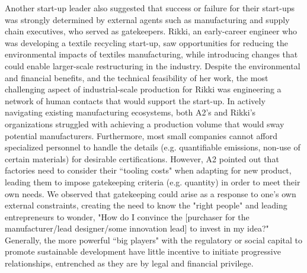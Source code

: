 \documentclass[manuscript,review,anonymous]{acmart}
\begin{document}
Another start-up leader also suggested that success or failure for their start-ups was strongly determined by external agents such as manufacturing and supply chain executives, who served as gatekeepers. Rikki, an early-career engineer who was developing a textile recycling start-up, saw opportunities for reducing the environmental impacts of textiles manufacturing, while introducing changes that could enable larger-scale restructuring in the industry. Despite the environmental and financial benefits, and the technical feasibility of her work, the most challenging aspect of industrial-scale production for Rikki was engineering a network of human contacts that would support the start-up. In actively navigating existing manufacturing ecosystems, both A2's and Rikki's organizations struggled with achieving a production volume that would sway potential manufacturers. Furthermore, most small companies cannot afford specialized personnel to handle the details (e.g. quantifiable emissions, non-use of certain materials) for desirable certifications. However, A2 pointed out that factories need to consider their ``tooling costs" when adapting for new product, leading them to impose gatekeeping criteria (e.g. quantity) in order to meet their own needs. We observed that gatekeeping could arise as a response to one's own external constraints, creating the need to know the "right people" and leading entrepreneurs to wonder, "How do I convince the [purchaser for the manufacturer/lead designer/some innovation lead] to invest in my idea?" Generally, the more powerful ``big players" with the regulatory or social capital to promote sustainable development have little incentive to initiate progressive relationships, entrenched as they are by legal and financial privilege.
\end{document}
